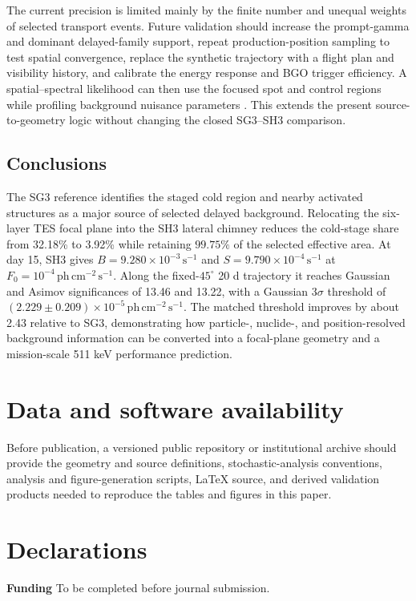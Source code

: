 \documentclass[11pt]{article}
\newcommand{\phcms}{\ensuremath{\,\mathrm{ph\,cm^{-2}\,s^{-1}}}}
\newcommand{\cps}{\ensuremath{\,\mathrm{s^{-1}}}}
\begin{document}
The current precision is limited mainly by the finite number and unequal weights
of selected transport events. Future validation should increase the prompt-gamma
and dominant delayed-family support, repeat production-position sampling to test
spatial convergence, replace the synthetic trajectory with a flight plan and
visibility history, and calibrate the energy response and BGO trigger efficiency.
A spatial--spectral likelihood can then use the focused spot and control regions
while profiling background nuisance parameters \cite{Cowan2011}. This extends
the present source-to-geometry logic without changing the closed SG3--SH3
comparison.

\subsection{Conclusions}
\label{sec:conclusions}

The SG3 reference identifies the staged cold region and nearby activated
structures as a major source of selected delayed background. Relocating the
six-layer TES focal plane into the SH3 lateral chimney reduces the cold-stage
share from 32.18\% to 3.92\% while retaining $99.75\%$ of the selected effective
area. At day 15, SH3 gives $B=9.280\times10^{-3}\cps$ and
$S=9.790\times10^{-4}\cps$ at $F_0=10^{-4}\phcms$. Along the fixed-$45^\circ$
20 d trajectory it reaches Gaussian and Asimov significances of 13.46 and 13.22,
with a Gaussian $3\sigma$ threshold of
$(2.229\pm0.209)\times10^{-5}\phcms$. The matched threshold improves by about
2.43 relative to SG3, demonstrating how particle-, nuclide-, and
position-resolved background information can be converted into a focal-plane
geometry and a mission-scale 511 keV performance prediction.

\section*{Data and software availability}
Before publication, a versioned public repository or institutional archive should provide the geometry and source definitions, stochastic-analysis conventions, analysis and figure-generation scripts, LaTeX source, and derived validation products needed to reproduce the tables and figures in this paper.

\section*{Declarations}
\textbf{Funding} To be completed before journal submission.
\end{document}
